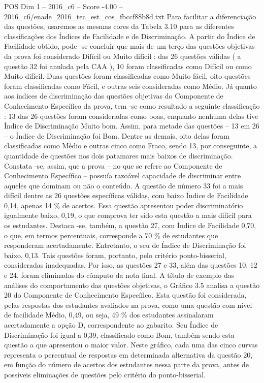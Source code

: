 \begin{textsample}{POS Dim 1 – 2016\_c6 – Score -4.00 – 2016\_c6/enade\_2016\_tec\_est\_cos\_fbccf88b8d.txt}
Para facilitar a diferenciação das questões, usaremos as mesmas cores da Tabela 3.10 para as diferentes classificações dos Índices de Facilidade e de Discriminação.
A partir do Índice de Facilidade obtido, pode -se concluir que mais de um terço das questões objetivas da prova foi considerado Difícil ou Muito difícil : das 26 questões válidas ( a questão 32 foi anulada pela CAA ), 10 foram classificadas como Difícil ou como Muito difícil.
Duas questões foram classificadas como Muito fácil, oito questões foram classificadas como Fácil, e outras seis consideradas como Médio.
Já quanto aos índices de discriminação das questões objetivas do Componente de Conhecimento Específico da prova, tem -se como resultado a seguinte classificação : 13 das 26 questões foram consideradas como boas, enquanto nenhuma delas tive Índice de Discriminação Muito bom.
Assim, para metade das questões – 13 em 26 – o Índice de Discriminação foi Bom.
Dentre as demais, oito delas foram classificadas como Médio e outras cinco como Fraco, sendo 13, por conseguinte, a quantidade de questões nos dois patamares mais baixos de discriminação.
Constata -se, assim, que a prova – no que se refere ao Componente de Conhecimento Específico – possuía razoável capacidade de discriminar entre aqueles que dominam ou não o conteúdo.
A questão de número 33 foi a mais difícil dentre as 26 questões específicas válidas, com baixo Índice de Facilidade 0,14, apenas 14 \% de acertos.
Essa questão apresentou poder discriminatório igualmente baixo, 0,19, o que comprova ter sido esta questão a mais difícil para os estudantes.
Destaca -se, também, a questão 27, com Índice de Facilidade 0,70, o que, em termos percentuais, corresponde a 70 \% de estudantes que responderam acertadamente.
Entretanto, o seu de Índice de Discriminação foi baixo, 0,13.
Tais questões foram, portanto, pelo critério ponto-bisserial, consideradas inadequadas.
Por isso, as questões 27 e 33, além das questões 10, 12 e 24, foram eliminadas do cômputo da nota final.
A título de exemplo das análises do comportamento das questões objetivas, o Gráfico 3.5 analisa a questão 20 do Componente de Conhecimento Específico.
Esta questão foi considerada, pelas respostas dos estudantes avaliados na prova, como uma questão com nível de facilidade Médio, 0,49, ou seja, 49 \% dos estudantes assinalaram acertadamente a opção D, correspondente ao gabarito.
Seu Índice de Discriminação foi igual a 0,39, classificado como Bom, também sendo esta questão a que apresentou o maior valor.
Neste gráfico, cada uma das cinco curvas representa o percentual de respostas em determinada alternativa da questão 20, em função do número de acertos dos estudantes nessa parte da prova, antes de possíveis eliminações de questões pelo critério do ponto-bisserial.

\end{textsample}
